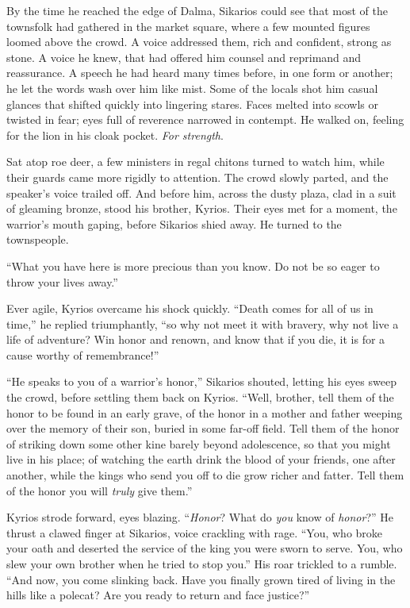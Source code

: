 By the time he reached the edge of Dalma, Sikarios could see that most of the townsfolk had gathered in the market square, where a few mounted figures loomed above the crowd. A voice addressed them, rich and confident, strong as stone. A voice he knew, that had offered him counsel and reprimand and reassurance. A speech he had heard many times before, in one form or another; he let the words wash over him like mist. Some of the locals shot him casual glances that shifted quickly into lingering stares. Faces melted into scowls or twisted in fear; eyes full of reverence narrowed in contempt. He walked on, feeling for the lion in his cloak pocket. \emph{For strength}.

Sat atop roe deer, a few ministers in regal chitons turned to watch him, while their guards came more rigidly to attention. The crowd slowly parted, and the speaker's voice trailed off. And before him, across the dusty plaza, clad in a suit of gleaming bronze, stood his brother, Kyrios. Their eyes met for a moment, the warrior's mouth gaping, before Sikarios shied away. He turned to the townspeople.

``What you have here is more precious than you know. Do not be so eager to throw your lives away.''

Ever agile, Kyrios overcame his shock quickly. ``Death comes for all of us in time,'' he replied triumphantly, ``so why not meet it with bravery, why not live a life of adventure? Win honor and renown, and know that if you die, it is for a cause worthy of remembrance!''

``He speaks to you of a warrior's honor,'' Sikarios shouted, letting his eyes sweep the crowd, before settling them back on Kyrios. ``Well, brother, tell them of the honor to be found in an early grave, of the honor in a mother and father weeping over the memory of their son, buried in some far-off field. Tell them of the honor of striking down some other kine barely beyond adolescence, so that you might live in his place; of watching the earth drink the blood of your friends, one after another, while the kings who send you off to die grow richer and fatter. Tell them of the honor you will \emph{truly} give them.''

Kyrios strode forward, eyes blazing. ``\emph{Honor}? What do \emph{you} know of \emph{honor}?'' He thrust a clawed finger at Sikarios, voice crackling with rage. ``You, who broke your oath and deserted the service of the king you were sworn to serve. You, who slew your own brother when he tried to stop you.'' His roar trickled to a rumble. ``And now, you come slinking back. Have you finally grown tired of living in the hills like a polecat? Are you ready to return and face justice?''

